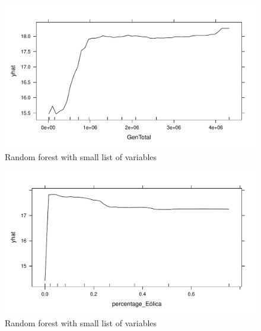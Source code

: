 \documentclass[
]{report}
\begin{document}
\begin{figure}

{\centering \includegraphics{Modelling_Energy_Intensity-V3_files/figure-pdf/unnamed-chunk-9-3.pdf}

}

\caption{Random forest with small list of variables}

\end{figure}

\begin{figure}

{\centering \includegraphics{Modelling_Energy_Intensity-V3_files/figure-pdf/unnamed-chunk-9-4.pdf}

}

\caption{Random forest with small list of variables}

\end{figure}
\end{document}
